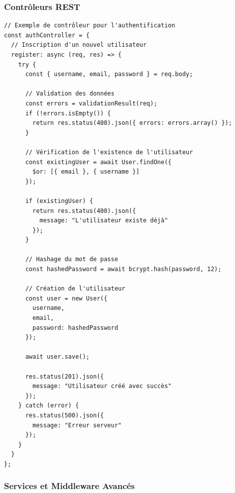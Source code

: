 \documentclass[12pt,a4paper]{article}
\begin{document}
\subsubsection{Contrôleurs REST}
\begin{lstlisting}[caption=Contrôleur d'authentification]
// Exemple de contrôleur pour l'authentification
const authController = {
  // Inscription d'un nouvel utilisateur
  register: async (req, res) => {
    try {
      const { username, email, password } = req.body;
      
      // Validation des données
      const errors = validationResult(req);
      if (!errors.isEmpty()) {
        return res.status(400).json({ errors: errors.array() });
      }
      
      // Vérification de l'existence de l'utilisateur
      const existingUser = await User.findOne({ 
        $or: [{ email }, { username }] 
      });
      
      if (existingUser) {
        return res.status(400).json({ 
          message: "L'utilisateur existe déjà" 
        });
      }
      
      // Hashage du mot de passe
      const hashedPassword = await bcrypt.hash(password, 12);
      
      // Création de l'utilisateur
      const user = new User({
        username,
        email,
        password: hashedPassword
      });
      
      await user.save();
      
      res.status(201).json({ 
        message: "Utilisateur créé avec succès" 
      });
    } catch (error) {
      res.status(500).json({ 
        message: "Erreur serveur" 
      });
    }
  }
};
\end{lstlisting}

\subsubsection{Services et Middleware Avancés}
\end{document}
